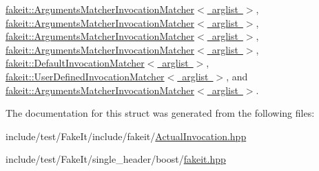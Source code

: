 \mbox{\hyperlink{structfakeit_1_1ArgumentsMatcherInvocationMatcher_a7da0c96fb549a6bb4b944214514e4ca8}{fakeit\+::\+Arguments\+Matcher\+Invocation\+Matcher$<$ arglist $>$}}, \mbox{\hyperlink{structfakeit_1_1ArgumentsMatcherInvocationMatcher_a7da0c96fb549a6bb4b944214514e4ca8}{fakeit\+::\+Arguments\+Matcher\+Invocation\+Matcher$<$ arglist $>$}}, \mbox{\hyperlink{structfakeit_1_1ArgumentsMatcherInvocationMatcher_a7da0c96fb549a6bb4b944214514e4ca8}{fakeit\+::\+Arguments\+Matcher\+Invocation\+Matcher$<$ arglist $>$}}, \mbox{\hyperlink{structfakeit_1_1ArgumentsMatcherInvocationMatcher_a7da0c96fb549a6bb4b944214514e4ca8}{fakeit\+::\+Arguments\+Matcher\+Invocation\+Matcher$<$ arglist $>$}}, \mbox{\hyperlink{structfakeit_1_1DefaultInvocationMatcher_a6eec95726a684a4dc2498b00e68e8166}{fakeit\+::\+Default\+Invocation\+Matcher$<$ arglist $>$}}, \mbox{\hyperlink{structfakeit_1_1UserDefinedInvocationMatcher_a52f5b5e7de4484b7e9fecb166f6b80e2}{fakeit\+::\+User\+Defined\+Invocation\+Matcher$<$ arglist $>$}}, and \mbox{\hyperlink{structfakeit_1_1ArgumentsMatcherInvocationMatcher_a7da0c96fb549a6bb4b944214514e4ca8}{fakeit\+::\+Arguments\+Matcher\+Invocation\+Matcher$<$ arglist $>$}}.



The documentation for this struct was generated from the following files\+:\begin{DoxyCompactItemize}
\item 
include/test/\+Fake\+It/include/fakeit/\mbox{\hyperlink{ActualInvocation_8hpp}{Actual\+Invocation.\+hpp}}\item 
include/test/\+Fake\+It/single\+\_\+header/boost/\mbox{\hyperlink{single__header_2boost_2fakeit_8hpp}{fakeit.\+hpp}}\end{DoxyCompactItemize}

